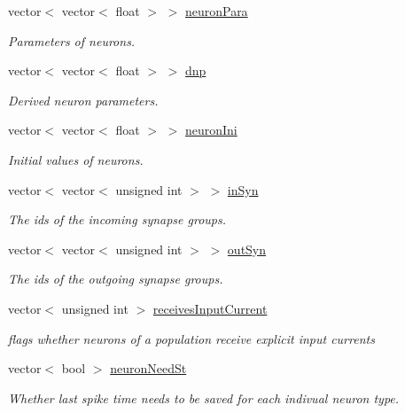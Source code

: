 \begin{DoxyCompactItemize}
vector$<$ vector$<$ float $>$ $>$ \hyperlink{classNNmodel_a4711c16ac1dc4bd09255f69a3469a4bd}{neuron\+Para}
\begin{DoxyCompactList}\small\item\em Parameters of neurons. \end{DoxyCompactList}\item 
vector$<$ vector$<$ float $>$ $>$ \hyperlink{classNNmodel_a7f834f3863c06a5b2381c0adddb901b8}{dnp}
\begin{DoxyCompactList}\small\item\em Derived neuron parameters. \end{DoxyCompactList}\item 
vector$<$ vector$<$ float $>$ $>$ \hyperlink{classNNmodel_a04c2e61ef297c1e0fd3f0acb32f79a17}{neuron\+Ini}
\begin{DoxyCompactList}\small\item\em Initial values of neurons. \end{DoxyCompactList}\item 
vector$<$ vector$<$ unsigned int $>$ $>$ \hyperlink{classNNmodel_af3f5459e9438989b12e4b675352dd258}{in\+Syn}
\begin{DoxyCompactList}\small\item\em The ids of the incoming synapse groups. \end{DoxyCompactList}\item 
vector$<$ vector$<$ unsigned int $>$ $>$ \hyperlink{classNNmodel_a6ba57b83448ab23eaa5a68d40b2ceac9}{out\+Syn}
\begin{DoxyCompactList}\small\item\em The ids of the outgoing synapse groups. \end{DoxyCompactList}\item 
vector$<$ unsigned int $>$ \hyperlink{classNNmodel_acd0592315c59ac3c0e0dbe9bb35d7004}{receives\+Input\+Current}
\begin{DoxyCompactList}\small\item\em flags whether neurons of a population receive explicit input currents \end{DoxyCompactList}\item 
vector$<$ bool $>$ \hyperlink{classNNmodel_ad14509938bfeb7f2fc8f011d2ec995ac}{neuron\+Need\+St}
\begin{DoxyCompactList}\small\item\em Whether last spike time needs to be saved for each indivual neuron type. \end{DoxyCompactList}\item 

\end{DoxyCompactItemize}
